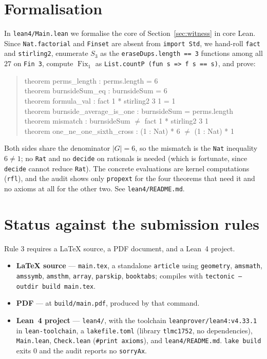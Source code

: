 \documentclass[11pt]{article}
\theoremstyle{definition}
\theoremstyle{remark}
\newcommand{\Sthree}{S_3}
\newcommand{\Fix}{\operatorname{Fix}}
\begin{document}
\section{Formalisation}

In \texttt{lean4/Main.lean} we formalise the core of
Section~\ref{sec:witness} in core Lean. Since \texttt{Nat.factorial} and
\texttt{Finset} are absent from \texttt{import Std}, we hand-roll
\texttt{fact} and \texttt{stirling2}, enumerate $\Sthree$ as the
\texttt{eraseDups.length == 3} functions among all $27$ on \texttt{Fin 3},
compute $\Fix_1$ as \texttt{List.countP (fun s => f s == s)}, and prove:
\begin{quote}\ttfamily
theorem perms\_length : perms.length = 6\\
theorem burnsideSum\_eq : burnsideSum = 6\\
theorem formula\_val : fact 1 * stirling2 3 1 = 1\\
theorem burnside\_average\_is\_one : burnsideSum = perms.length\\
theorem mismatch : burnsideSum \(\ne\) fact 1 * stirling2 3 1\\
theorem one\_ne\_one\_sixth\_cross : (1 : Nat) * 6 \(\ne\) (1 : Nat) * 1
\end{quote}
Both sides share the denominator $|G|=6$, so the mismatch is the \texttt{Nat}
inequality $6 \ne 1$; no \texttt{Rat} and no \texttt{decide} on rationals is
needed (which is fortunate, since \texttt{decide} cannot reduce \texttt{Rat}).
The concrete evaluations are kernel computations (\texttt{rfl}), and the audit
shows only \texttt{propext} for the four theorems that need it and no axioms at
all for the other two. See \texttt{lean4/README.md}.

\section*{Status against the submission rules}

Rule 3 requires a LaTeX source, a PDF document, and a Lean~4 project.
\begin{itemize}
\item \textbf{LaTeX source} --- \texttt{main.tex}, a standalone \texttt{article}
  using \texttt{geometry}, \texttt{amsmath}, \texttt{amssymb}, \texttt{amsthm},
  \texttt{array}, \texttt{parskip}, \texttt{booktabs}; compiles with
  \texttt{tectonic --outdir build main.tex}.
\item \textbf{PDF} --- at \texttt{build/main.pdf}, produced by that command.
\item \textbf{Lean~4 project} --- \texttt{lean4/}, with the toolchain
  \texttt{leanprover/lean4:v4.33.1} in \texttt{lean-toolchain}, a
  \texttt{lakefile.toml} (library \texttt{tlmc1752}, no dependencies),
  \texttt{Main.lean}, \texttt{Check.lean} (\texttt{\#print axioms}), and
  \texttt{lean4/README.md}. \texttt{lake build} exits $0$ and the audit
  reports no \texttt{sorryAx}.
\end{itemize}
\end{document}
